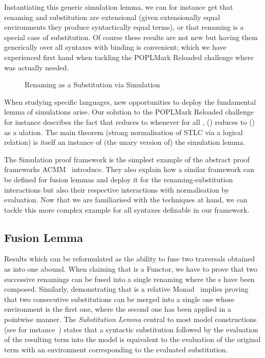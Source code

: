 Instantiating this generic simulation lemma, we can for instance get
that renaming and substitution are extensional (given extensionally
equal environments they produce syntactically equal terms), or that
renaming is a special case of substitution. Of course these results
are not new but having them generically over all syntaxes with binding
is convenient; which we have experienced first hand when tackling the
POPLMark Reloaded challenge where  was actually needed.

\begin{figure}[h]
\caption{Renaming as a Substitution via Simulation}
\end{figure}

When studying specific languages, new opportunities to deploy the
fundamental lemma of simulations arise. Our solution to the POPLMark
Reloaded challenge for instance describes the fact that { \AB{$\rho$} }
reduces to {  } whenever for all ,
\AB{$\rho$}() reduces to () as a ulation.
The main theorem (strong normalisation of STLC via a logical relation)
is itself an instance of (the unary version of) the simulation lemma.

The Simulation proof framework is the simplest example of the abstract
proof frameworks ACMM~\citeyear{allais2017type} introduce. They also
explain how a similar framework can be defined
for fusion lemmas and deploy it for the renaming-substitution interactions
but also their respective interactions with normalisation by evaluation.
Now that we are familiarised with the techniques at hand, we can tackle
this more complex example for all syntaxes definable in our framework.



\subsection{Fusion Lemma}\label{section:fusion}

Results which can be reformulated as the ability to fuse two traversals
obtained as \semrec{} into one abound. When claiming that  is
a Functor, we have to prove that two successive renamings can be fused into
a single renaming where the s have been composed. Similarly,
demonstrating that  is a relative Monad~\cite{JFR4389} implies proving
that two consecutive substitutions can be merged into a single one whose
environment is the first one, where the second one has been applied in a
pointwise manner. The \emph{Substitution Lemma} central
to most model constructions (see for instance~\cite{mitchell1991kripke}) states
that a syntactic substitution followed by the evaluation of the resulting term
into the model is equivalent to the evaluation of the original term with an
environment corresponding to the evaluated substitution.

